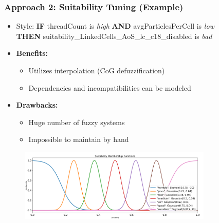 \documentclass[
	10pt,
	t		%
]{beamer}
\begin{document}
\begin{frame}
	\frametitle{Approach 2: Suitability Tuning (Example)}
	\begin{itemize}
		\item Style: {\small
		      \textbf{IF} threadCount is \textit{high} \textbf{AND} avgParticlesPerCell is \textit{low}\\ \qquad \qquad \quad \textbf{THEN} suitability\_LinkedCells\_AoS\_lc\_c18\_disabled is \textit{bad}}
		      
		\item \textbf{Benefits:}
		      \begin{itemize}
			      \item Utilizes interpolation (CoG defuzzification)
			      \item Dependencies and incompatibilities can be modeled
		      \end{itemize}
		\item \textbf{Drawbacks:}
		      \begin{itemize}
			      \item Huge number of fuzzy systems
			      \item Impossible to maintain by hand
		      \end{itemize}
	\end{itemize}
	
	\begin{figure}
		\centering
		\includegraphics[width=0.82\textwidth,trim={0 0 0 1.8cm},clip]{figures/suitability-linguistic-variable.png}
	\end{figure}
	
\end{frame}
\end{document}
